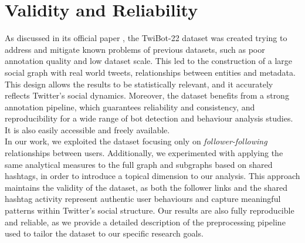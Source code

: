 \documentclass[12pt, a4paper]{article}
\begin{document}
\section{Validity and Reliability} \label{validity-and-reliability-not-needed-for-the-project-proposal}
	As discussed in its official paper \cite{twibot22}, the TwiBot-22 dataset was created trying to address and mitigate known problems of previous datasets, such as poor annotation quality and low dataset scale. This led to the construction of a large social graph with real world tweets, relationships between entities and metadata. This design allows the results to be statistically relevant, and it accurately reflects Twitter’s social dynamics. Moreover, the dataset benefits from a strong annotation pipeline, which guarantees reliability and consistency, and reproducibility for a wide range of bot detection and behaviour analysis studies. It is also easily accessible and freely available.\\
    In our work, we exploited the dataset focusing only on \textit{follower-following} relationships between users. Additionally, we experimented with applying the same analytical measures to the full graph and subgraphs based on shared hashtags, in order to introduce a topical dimension to our analysis. This approach maintains the validity of the dataset, as both the follower links and the shared hashtag activity represent authentic user behaviours and capture meaningful patterns within Twitter’s social structure. Our results are also fully reproducible and reliable, as we provide a detailed description of the preprocessing pipeline used to tailor the dataset to our specific research goals.
\end{document}
